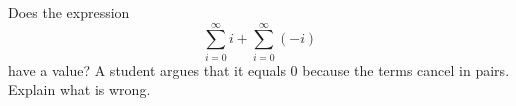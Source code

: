 Does the expression
\[
\sum_{i=0}^{\infty}i+\sum_{i=0}^{\infty}(-i)
\]
have a value? A student argues that it equals $0$ because the terms cancel in pairs. Explain what is wrong.
